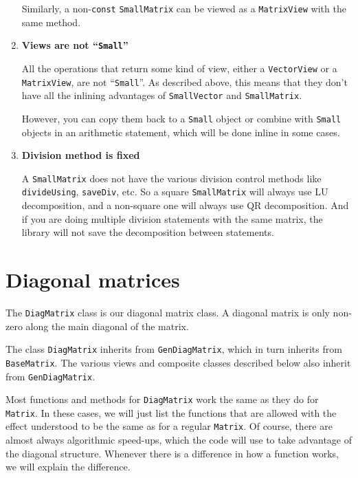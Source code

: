 \documentclass[twoside,letterpaper,11pt]{article}
\renewcommand{\tt}[1]{{\lstinline {#1}}}
\begin{document}
\begin{enumerate}
Similarly, a non-\tt{const} \tt{SmallMatrix} can be viewed as a \tt{MatrixView}
with the same method.

\item
\textbf{Views are not ``\tt{Small}''}

All the operations that return some kind of view,
either a \tt{VectorView} or a \tt{MatrixView}, are not ``\tt{Small}''.
As described above, this means that they don't have all the inlining advantages of 
\tt{SmallVector} and \tt{SmallMatrix}.  

However, you can copy them back to a \tt{Small} object or combine
with \tt{Small} objects in an arithmetic statement, which will be done inline
in some cases.

\item
\textbf{Division method is fixed}

A \tt{SmallMatrix} does not have the various division control methods 
like \tt{divideUsing}, \tt{saveDiv}, etc.
So a square \tt{SmallMatrix} will always use
LU decomposition, and a non-square one will always use QR decomposition.
And if you are doing multiple division statements with the same matrix,
the library will not save the decomposition between statements.  

\end{enumerate}

\newpage
\section{Diagonal matrices}
\label{DiagMatrix}

The \tt{DiagMatrix} class is our diagonal matrix class.  
A diagonal matrix is only non-zero
along the main diagonal of the matrix.  

The class \tt{DiagMatrix} inherits from \tt{GenDiagMatrix},
which in turn inherits from \tt{BaseMatrix}.
The various views and composite classes described below
also inherit from \tt{GenDiagMatrix}.

Most functions and methods for \tt{DiagMatrix} work the same
as they do for \tt{Matrix}.
In these cases, we will just list the functions
that are allowed with the
effect understood to be the same as for a regular \tt{Matrix}.  Of course, there are 
almost always algorithmic speed-ups, which the code will use to take advantage of the 
diagonal structure.
Whenever there is a difference in how a function works,
we will explain the difference.
\end{document}
